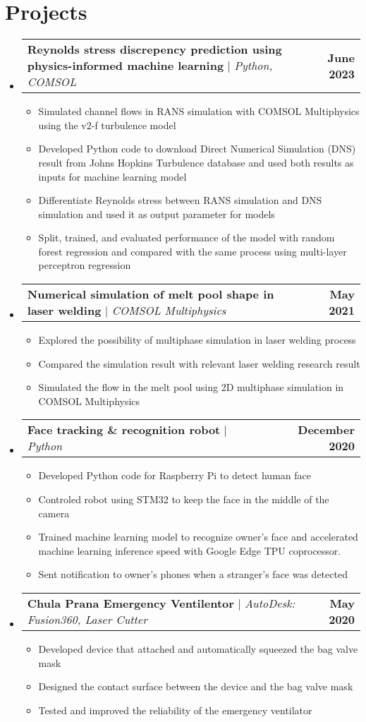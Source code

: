\documentclass[letterpaper,11pt]{article}
\makeatletter
\newcommand{\resumeItem}[1]{
  \item\small{
    {#1 \vspace{-2pt}}
  }
}
\newcommand{\resumeProjectHeading}[2]{
    \item
    \begin{tabular*}{1.001\textwidth}{l@{\extracolsep{\fill}}r}
      \small#1 & \textbf{\small #2}\\
    \end{tabular*}\vspace{-7pt}
}
\newcommand{\resumeSubHeadingListStart}{\begin{itemize}[leftmargin=0.0in, label={}]}
\newcommand{\resumeSubHeadingListEnd}{\end{itemize}}
\newcommand{\resumeItemListStart}{\begin{itemize}}
\newcommand{\resumeItemListEnd}{\end{itemize}\vspace{-5pt}}
\makeatother
\begin{document}
\section{Projects}
    \vspace{-5pt}
    \resumeSubHeadingListStart
      \resumeProjectHeading
          {\textbf{Reynolds stress discrepency prediction using physics-informed machine learning} $|$ \emph{Python, COMSOL} }{June 2023}
          \resumeItemListStart
            \resumeItem{Simulated channel flows in RANS simulation with COMSOL Multiphysics\textsuperscript{\textregistered} using the v2-f turbulence model}
            \resumeItem{Developed Python code to download Direct Numerical Simulation (DNS) result from Johns Hopkins Turbulence database and used both results as inputs for machine learning model}
            \resumeItem{Differentiate Reynolds stress between RANS simulation and DNS simulation and used it as output parameter for models}
            \resumeItem{Split, trained, and evaluated performance of the model with random forest regression and compared with the same process using multi-layer perceptron regression}
          \resumeItemListEnd
          \vspace{-13pt}
      \resumeProjectHeading
          {\textbf{Numerical simulation of melt pool shape in laser welding} $|$ \emph{COMSOL Multiphysics\textsuperscript{\textregistered}}}{May 2021}
          \resumeItemListStart
            \resumeItem{Explored the possibility of multiphase simulation in laser welding process}
            \resumeItem{Compared the simulation result with relevant laser welding research result}
            \resumeItem{Simulated the flow in the melt pool using 2D multiphase simulation in COMSOL Multiphysics\textsuperscript{\textregistered}}
          \resumeItemListEnd 
          \vspace{-13pt}
          \resumeProjectHeading
          {\textbf{Face tracking \& recognition robot} $|$ \emph{Python}}{December 2020}
          \resumeItemListStart
            \resumeItem{Developed Python code for Raspberry Pi to detect human face}
            \resumeItem{Controled robot using STM32 to keep the face in the middle of the camera}
            \resumeItem{Trained machine learning model to recognize owner's face and accelerated machine learning inference speed with Google Edge TPU coprocessor.}
            \resumeItem{Sent notification to owner's phones when a stranger's face was detected}
          \resumeItemListEnd 
          \vspace{-13pt}
          \resumeProjectHeading
          {\textbf{Chula Prana Emergency Ventilentor} $|$ \emph{AutoDesk: Fusion360, Laser Cutter}}{May 2020}
          \resumeItemListStart
            \resumeItem{Developed device that attached and automatically squeezed the bag valve mask}
            \resumeItem{Designed the contact surface between the device and the bag valve mask}
            \resumeItem{Tested and improved the reliability of the emergency ventilator}
          \resumeItemListEnd 
    \resumeSubHeadingListEnd
\vspace{-15pt}
\end{document}
